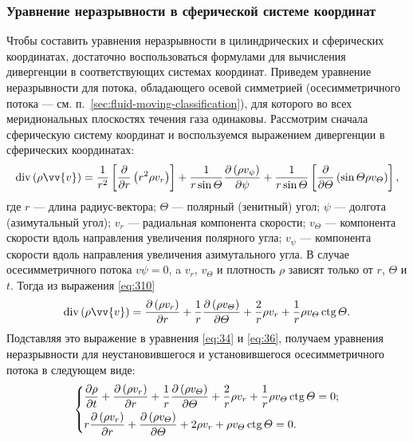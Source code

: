 	\subsubsection{Уравнение неразрывности в сферической системе координат}
	Чтобы составить уравнения неразрывности в цилиндрических и сферических координатах, достаточно воспользоваться формулами для вычисления дивергенции в соответствующих системах координат.\n
	Приведем уравнение неразрывности для потока, обладающего осевой симметрией (осесимметричного потока --- см. п.~\ref{sec:fluid-moving-classification}), для которого во всех меридиональных плоскостях течения газа одинаковы. Рассмотрим сначала сферическую систему координат и воспользуемся выражением дивергенции в сферических координатах:
	\begin{gather}
		\diverg\left(\rho\vv{v}\right) = \frac{1}{r^2}\left[\frac{\pp}{\pp r}\left(r^2\rho v_r\right)\right] + \frac{1}{r \sin\varTheta}\frac{\pp \left(\rho v_\psi\right)}{\pp \psi} + \frac{1}{r \sin\varTheta}\left[\frac{\pp}{\pp\varTheta}\left(\sin\varTheta\rho v_\varTheta\right)\right],\label{eq:310}
	\end{gather}
	где $r$ --- длина радиус-вектора; $\varTheta$ --- полярный (зенитный) угол; $\psi$ --- долгота (азимутальный угол); $v_r$ --- радиальная компонента скорости; $v_\varTheta$ --- компонента скорости вдоль направления увеличения полярного угла; $v_\psi$ --- компонента скорости вдоль направления увеличения азимутального угла.\n
	В случае осесимметричного потока $v\psi = 0$, a $v_r$, $v_\varTheta$ и плотность $\rho$ зависят только от $r$, $\varTheta$ и $t$. Тогда из выражения \eqref{eq:310}
	\begin{gather*}
		\diverg\left(\rho\vv{v}\right) = \frac{\pp\left(\rho v_r\right)}{\pp r} + \frac{1}{r}\frac{\pp\left(\rho v_\varTheta\right)}{\pp\varTheta} + \frac{2}{r}\rho v_r + \frac{1}{r}\rho v_\varTheta\ctg\varTheta.
	\end{gather*}\n
	Подставляя это выражение в уравнения \eqref{eq:34} и \eqref{eq:36}, получаем уравнения неразрывности для неустановившегося и установившегося осесимметричного потока в следующем виде:
	\begin{gather}
		\begin{dcases}\label{eq:311}
			\frac{\partial\rho}{\partial t} + \frac{\partial\left(\rho v_r\right)}{\partial r} + \frac{1}{r}\frac{\partial\left(\rho v_\varTheta\right)}{\partial\varTheta} + \frac{2}{r}\rho v_r + \frac{1}{r}\rho v_\varTheta\operatorname{ctg}\varTheta = 0;\\
			r\frac{\partial\left(\rho v_r\right)}{\partial r} + \frac{\partial\left(\rho v_\varTheta\right)}{\partial\varTheta} + 2\rho v_r + \rho v_\varTheta\operatorname{ctg}\varTheta = 0.
		\end{dcases}
	\end{gather}
	
